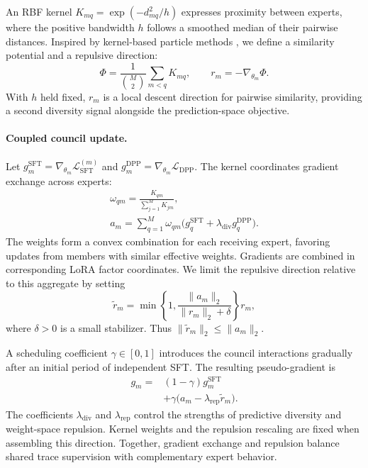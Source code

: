 \documentclass[11pt,twocolumn]{article}
\newcommand{\Lcal}{\mathcal{L}}
\begin{document}
An RBF kernel $K_{mq}=\exp(-d_{mq}^{2}/h)$ expresses proximity between
experts, where the positive bandwidth $h$ follows a smoothed median of their
pairwise distances. Inspired by kernel-based particle methods
\citep{liu2016svgd}, we define a similarity potential and a repulsive direction:
\begin{equation}
 \Phi=\frac{1}{\binom{M}{2}}\sum_{m<q}K_{mq},
 \qquad r_m=-\nabla_{\theta_m}\Phi.
 \label{eq:stage1-repulsion}
\end{equation}
With $h$ held fixed, $r_m$ is a local descent direction for pairwise similarity,
providing a second diversity signal alongside the prediction-space objective.

\paragraph{Coupled council update.}
Let $g_m^{\mathrm{SFT}}=\nabla_{\theta_m}\Lcal_{\mathrm{SFT}}^{(m)}$ and
$g_m^{\mathrm{DPP}}=\nabla_{\theta_m}\Lcal_{\mathrm{DPP}}$. The kernel
coordinates gradient exchange across experts:
\begin{equation}
 \begin{gathered}
 \omega_{qm}=\frac{K_{qm}}{\sum_{j=1}^{M}K_{jm}},\\
 a_m=\sum_{q=1}^{M}\omega_{qm}
       \bigl(g_q^{\mathrm{SFT}}+\lambda_{\mathrm{div}}g_q^{\mathrm{DPP}}\bigr).
 \end{gathered}
 \label{eq:stage1-mixing}
\end{equation}
The weights form a convex combination for each receiving expert, favoring
updates from members with similar effective weights. Gradients are combined
in corresponding LoRA factor coordinates. We limit the repulsive direction
relative to this aggregate by setting
\begin{equation}
 \widetilde r_m=
 \min\left\{1,\frac{\|a_m\|_2}{\|r_m\|_2+\delta}\right\}r_m,
 \label{eq:stage1-repulsion-cap}
\end{equation}
where $\delta>0$ is a small stabilizer. Thus
$\|\widetilde r_m\|_2\le\|a_m\|_2$.

A scheduling coefficient $\gamma\in[0,1]$ introduces the council interactions
gradually after an initial period of independent SFT. The resulting
pseudo-gradient is
\begin{equation}
 \begin{aligned}
 g_m={}&(1-\gamma)g_m^{\mathrm{SFT}}\\
       &+\gamma\bigl(a_m-\lambda_{\mathrm{rep}}\widetilde r_m\bigr).
 \end{aligned}
 \label{eq:stage1-update}
\end{equation}
The coefficients $\lambda_{\mathrm{div}}$ and $\lambda_{\mathrm{rep}}$ control
the strengths of predictive diversity and weight-space repulsion. Kernel
weights and the repulsion rescaling are fixed when assembling this direction.
Together, gradient exchange and repulsion balance shared trace supervision
with complementary expert behavior.
\end{document}
